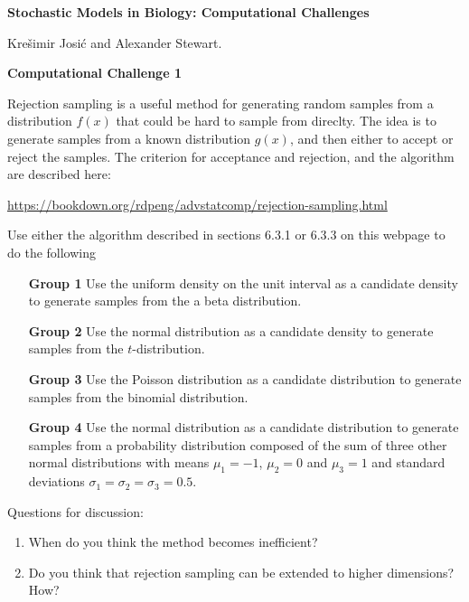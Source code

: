 \documentclass[12pt]{article}
\begin{document}
\begin{center}
{\Huge \bf Stochastic Models in Biology: Computational Challenges
\\ \vskip5mm  }


Kre\v simir Josi\'c and Alexander Stewart.
\end{center}



\begin{center}
{\Large \bf Computational Challenge 1
\\ \vskip5mm }
\end{center}

Rejection sampling is a  useful method for generating random samples from a distribution $f(x)$ that could be hard to sample from direclty. 
 The idea is to generate samples from a known distribution $g(x)$, and
then either to accept or reject the samples.  The criterion for acceptance and rejection,  and the algorithm are described here:

\vskip5mm

\href{https://bookdown.org/rdpeng/advstatcomp/rejection-sampling.html}{https://bookdown.org/rdpeng/advstatcomp/rejection-sampling.html}

\vskip5mm

Use either the algorithm described in sections 6.3.1 or 6.3.3 on this webpage to do the following

\begin{enumerate}
\item[\bf Group 1] Use the uniform density on the unit interval as a candidate density to generate samples from the a beta distribution.
\item[\bf Group 2] Use the normal distribution as a candidate density to generate samples from the $t$-distribution.
\item[\bf Group 3] Use the Poisson distribution as a candidate distribution to generate samples from the binomial distribution.
\item[\bf Group 4] Use the normal distribution as a candidate distribution to generate samples from a probability distribution composed of the sum of three other normal distributions with means $\mu_1=-1$, $\mu_2=0$ and $\mu_3=1$ and standard deviations $\sigma_1=\sigma_2=\sigma_3=0.5$.
\end{enumerate}

Questions for discussion:
\begin{enumerate}
\item When do you think the method becomes inefficient?  
\item Do you think that rejection sampling can be extended to higher dimensions? How?
\end{enumerate}
\end{document}
